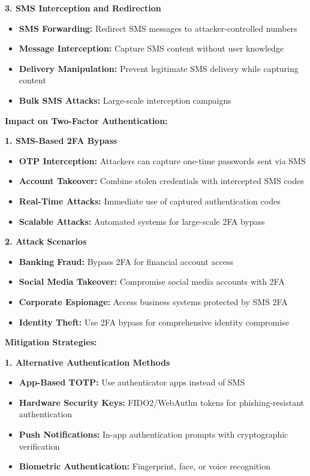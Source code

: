 \documentclass[12pt,a4paper]{article}
\begin{document}
\textbf{3. SMS Interception and Redirection}
\begin{itemize}
    \item \textbf{SMS Forwarding:} Redirect SMS messages to attacker-controlled numbers
    \item \textbf{Message Interception:} Capture SMS content without user knowledge
    \item \textbf{Delivery Manipulation:} Prevent legitimate SMS delivery while capturing content
    \item \textbf{Bulk SMS Attacks:} Large-scale interception campaigns
\end{itemize}

\textbf{Impact on Two-Factor Authentication:}

\textbf{1. SMS-Based 2FA Bypass}
\begin{itemize}
    \item \textbf{OTP Interception:} Attackers can capture one-time passwords sent via SMS
    \item \textbf{Account Takeover:} Combine stolen credentials with intercepted SMS codes
    \item \textbf{Real-Time Attacks:} Immediate use of captured authentication codes
    \item \textbf{Scalable Attacks:} Automated systems for large-scale 2FA bypass
\end{itemize}

\textbf{2. Attack Scenarios}
\begin{itemize}
    \item \textbf{Banking Fraud:} Bypass 2FA for financial account access
    \item \textbf{Social Media Takeover:} Compromise social media accounts with 2FA
    \item \textbf{Corporate Espionage:} Access business systems protected by SMS 2FA
    \item \textbf{Identity Theft:} Use 2FA bypass for comprehensive identity compromise
\end{itemize}

\textbf{Mitigation Strategies:}

\textbf{1. Alternative Authentication Methods}
\begin{itemize}
    \item \textbf{App-Based TOTP:} Use authenticator apps instead of SMS
    \item \textbf{Hardware Security Keys:} FIDO2/WebAuthn tokens for phishing-resistant authentication
    \item \textbf{Push Notifications:} In-app authentication prompts with cryptographic verification
    \item \textbf{Biometric Authentication:} Fingerprint, face, or voice recognition
\end{itemize}
\end{document}
